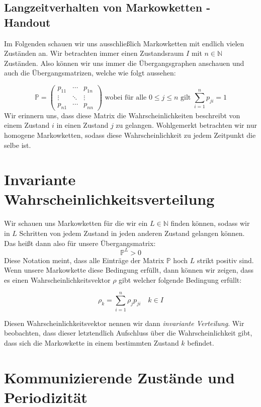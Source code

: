 \documentclass[a4paper]{article}
\begin{document}
\begin{center}
	\section*{Langzeitverhalten von Markowketten - Handout}
\end{center}

Im Folgenden schauen wir uns ausschließlich Markowketten mit endlich vielen Zuständen an.
Wir betrachten immer einen Zustandsraum $I$ mit $n \in \mathbb{N}$ Zuständen.
Also können wir uns immer die Übergangsgraphen anschauen und auch die Übergangsmatrizen,
welche wie folgt aussehen:

\[
\mathbb{P} = \begin{pmatrix} 
	p_{11} & \cdots & p_{1n} \\
	\vdots & \ddots & \vdots \\
	p_{n1} & \cdots & p_{nn}
\end{pmatrix} 
\text{ wobei für alle $0 \leq j \leq n$ gilt }
\sum_{i=1}^{n} p_{ji} = 1
\]
Wir erinnern uns, dass diese Matrix die Wahrscheinlichkeiten beschreibt von einem Zustand $i$ in einen
Zustand $j$ zu gelangen. Wohlgemerkt betrachten wir nur homogene Markowketten, sodass diese Wahrscheinlichkeit
zu jedem Zeitpunkt die selbe ist.

\section{Invariante Wahrscheinlichkeitsverteilung}
Wir schauen uns Markowketten für die wir ein $L \in \mathbb{N}$ finden können, sodass
wir in $L$ Schritten von jedem Zustand in jeden anderen Zustand gelangen können.
Das heißt dann also für unsere Übergangsmatrix:
\[
\mathbb{P} ^{L} > 0
\] 
Diese Notation meint, dass alle Einträge der Matrix $\mathbb{P}$ hoch $L$ strikt positiv sind.
Wenn unsere Markowkette diese Bedingung erfüllt, dann können wir zeigen, dass es einen
Wahrscheinlichkeitsvektor $\rho$ gibt welcher folgende Bedingung erfüllt:

\[
\rho_k = \sum_{i=1}^{n} \rho_j p_{ji} \quad k \in I
\]

Diesen Wahrscheinlichkeitsvektor nennen wir dann \textit{invariante Verteilung}.
Wir beobachten, dass dieser letztendlich Aufschluss über die Wahrscheinlichkeit gibt, dass sich die
Markowkette in einem bestimmten Zustand $k$ befindet.

\section{Kommunizierende Zustände und Periodizität}
\end{document}
